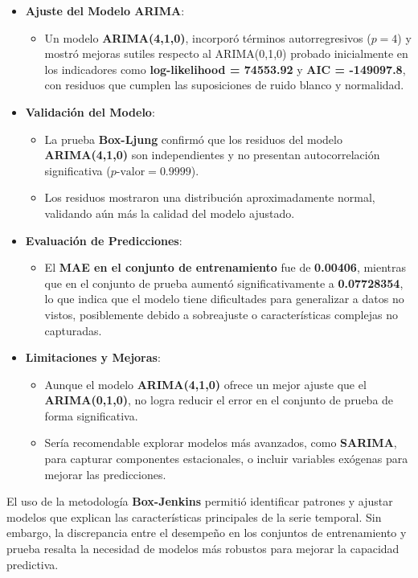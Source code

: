 \documentclass[
]{book}
\providecommand{\tightlist}{%
  \setlength{\itemsep}{0pt}\setlength{\parskip}{0pt}}
\begin{document}
\begin{itemize}
\tightlist
\item
  \textbf{Ajuste del Modelo ARIMA}:

  \begin{itemize}
  \tightlist
  \item
    Un modelo \textbf{ARIMA(4,1,0)}, incorporó términos autorregresivos (\(p = 4\)) y mostró mejoras sutiles respecto al ARIMA(0,1,0) probado inicialmente en los indicadores como \textbf{log-likelihood = 74553.92} y \textbf{AIC = -149097.8}, con residuos que cumplen las suposiciones de ruido blanco y normalidad.
  \end{itemize}
\item
  \textbf{Validación del Modelo}:

  \begin{itemize}
  \tightlist
  \item
    La prueba \textbf{Box-Ljung} confirmó que los residuos del modelo \textbf{ARIMA(4,1,0)} son independientes y no presentan autocorrelación significativa (\(p\text{-valor} = 0.9999\)).
  \item
    Los residuos mostraron una distribución aproximadamente normal, validando aún más la calidad del modelo ajustado.
  \end{itemize}
\item
  \textbf{Evaluación de Predicciones}:

  \begin{itemize}
  \tightlist
  \item
    El \textbf{MAE en el conjunto de entrenamiento} fue de \textbf{0.00406}, mientras que en el conjunto de prueba aumentó significativamente a \textbf{0.07728354}, lo que indica que el modelo tiene dificultades para generalizar a datos no vistos, posiblemente debido a sobreajuste o características complejas no capturadas.
  \end{itemize}
\item
  \textbf{Limitaciones y Mejoras}:

  \begin{itemize}
  \tightlist
  \item
    Aunque el modelo \textbf{ARIMA(4,1,0)} ofrece un mejor ajuste que el \textbf{ARIMA(0,1,0)}, no logra reducir el error en el conjunto de prueba de forma significativa.
  \item
    Sería recomendable explorar modelos más avanzados, como \textbf{SARIMA}, para capturar componentes estacionales, o incluir variables exógenas para mejorar las predicciones.
  \end{itemize}
\end{itemize}

El uso de la metodología \textbf{Box-Jenkins} permitió identificar patrones y ajustar modelos que explican las características principales de la serie temporal. Sin embargo, la discrepancia entre el desempeño en los conjuntos de entrenamiento y prueba resalta la necesidad de modelos más robustos para mejorar la capacidad predictiva.

  
\end{document}
